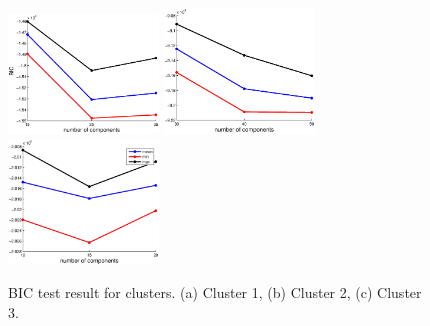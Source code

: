 \begin{figure}
  \centering
  \includegraphics[width=4cm]{./fig/bic_cluster1.eps}
  \includegraphics[width=4cm]{./fig/bic_cluster2.eps}
  \includegraphics[width=4cm]{./fig/bic_cluster3.eps}
  \caption{ \scriptsize{BIC test result for clusters. (a) Cluster 1, (b) Cluster 2, (c) Cluster 3.}
}

\label{fig:bic}
\end{figure}



